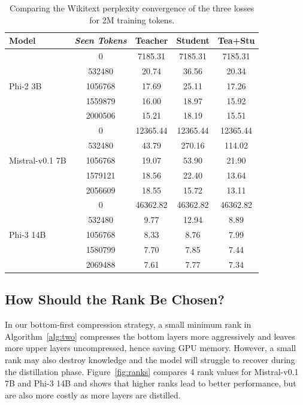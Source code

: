 \begin{table}[!ht]
    {\scriptsize{
    \begin{tabular}{lcccc}
    \toprule
    \textbf{Model} & \textit{Seen Tokens} & \textbf{Teacher} & \textbf{Student} & \textbf{Tea+Stu} \\
    \midrule
    \multirow{5}{*}{Phi-2 3B}
                              & 0       & 7185.31  & 7185.31  & 7185.31 \\
                              & 532480  & 20.74    & 36.56    & 20.34 \\
                              & 1056768 & 17.69    & 25.11    & 17.26 \\
                              & 1559879 & 16.00    & 18.97    & 15.92 \\
                              & 2000506 & 15.21    & 18.19    & 15.51 \\
    \midrule
    \multirow{5}{*}{Mistral-v0.1 7B}
                              & 0       & 12365.44 & 12365.44 & 12365.44 \\
                              & 532480  & 43.79    & 270.16   & 114.02 \\
                              & 1056768 & 19.07    & 53.90    & 21.90 \\
                              & 1579121 & 18.56    & 22.40    & 13.64 \\
                              & 2056609 & 18.55    & 15.72    & 13.11 \\
    \midrule
    \multirow{5}{*}{Phi-3 14B}
                              & 0       & 46362.82 & 46362.82 & 46362.82 \\
                              & 532480  & 9.77     & 12.94    & 8.89 \\
                              & 1056768 & 8.33     & 8.76     & 7.99 \\
                              & 1580799 & 7.70     & 7.85     & 7.44 \\
                              & 2069488 & 7.61     & 7.77     & 7.34 \\
    \bottomrule
    \end{tabular}
    }}
    \caption{Comparing the Wikitext perplexity convergence of the three losses for 2M training tokens.}
    \label{tab:logs}
\end{table}

\subsection{How Should the Rank Be Chosen?}
In our bottom-first compression strategy, a small minimum rank in
Algorithm~\ref{alg:two} compresses the bottom layers more aggressively and leaves
more upper layers uncompressed, hence saving GPU memory. However, a
small rank may also destroy knowledge and the model will struggle to recover
during the distillation phase. Figure~\ref{fig:ranks} compares 4 rank
values for Mistral-v0.1 7B and Phi-3 14B and shows that higher ranks
lead to better performance, but are also more costly as more layers are distilled.

